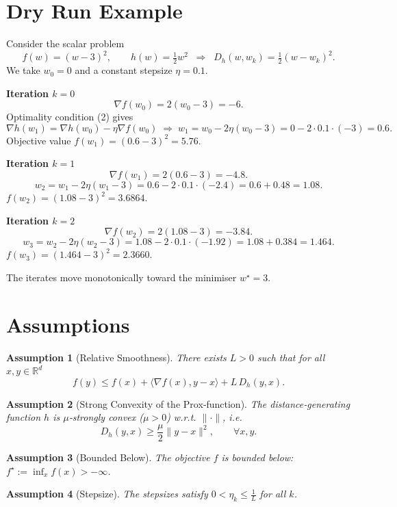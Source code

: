 \documentclass{article}
\newtheorem{assumption}{Assumption}
\newcommand{\grad}{\nabla}
\newcommand{\Breg}{D_{h}}
\begin{document}
\section*{Dry Run Example}
Consider the scalar problem  
\[
f(w)=(w-3)^2,\qquad h(w)=\tfrac12 w^{2}\;\;\Longrightarrow\;\;
\Breg (w,w_k)=\tfrac12 (w-w_k)^2 .
\]
We take $w_0=0$ and a constant stepsize $\eta=0.1$.

\bigskip
\noindent\textbf{Iteration $k=0$}
\[
\grad f(w_0)=2(w_0-3)=-6.
\]
Optimality condition (2) gives  
\[
\grad h(w_1)=\grad h(w_0)-\eta\grad f(w_0)
\;\Longrightarrow\; w_1 = w_0-2\eta (w_0-3)
                =0-2\cdot0.1\cdot(-3)=0.6 .
\]
Objective value $f(w_1)=(0.6-3)^2=5.76$.

\bigskip
\noindent\textbf{Iteration $k=1$}
\[
\grad f(w_1)=2(0.6-3)=-4.8.
\]
\[
w_2 = w_1-2\eta (w_1-3)
    =0.6-2\cdot0.1\cdot(-2.4)=0.6+0.48=1.08 .
\]
$f(w_2)=(1.08-3)^2=3.6864$.

\bigskip
\noindent\textbf{Iteration $k=2$}
\[
\grad f(w_2)=2(1.08-3)=-3.84.
\]
\[
w_3 = w_2-2\eta (w_2-3)
    =1.08-2\cdot0.1\cdot(-1.92)=1.08+0.384=1.464 .
\]
$f(w_3)=(1.464-3)^2=2.3660$.

The iterates move monotonically toward the minimiser $w^\star=3$.

\newpage
\section*{Assumptions}
\begin{assumption}[Relative Smoothness]\label{ass:smooth}
There exists $L>0$ such that for all $x,y\in\mathbb R^{d}$
\[
f(y)\le f(x)+\langle \grad f(x),y-x\rangle+L\,\Breg (y,x).
\tag{A1}
\]
\end{assumption}
\begin{assumption}[Strong Convexity of the Prox‑function]\label{ass:strong}
The distance‑generating function $h$ is $\mu$‑strongly convex ($\mu>0$) w.r.t. $\|\cdot\|$, i.e.
\[
\Breg (y,x)\ge\frac{\mu}{2}\|y-x\|^{2},\qquad\forall x,y.
\tag{A2}
\]
\end{assumption}
\begin{assumption}[Bounded Below]\label{ass:bound}
The objective $f$ is bounded below: $f^\star:=\inf_{x}f(x)>-\infty$.
\end{assumption}
\begin{assumption}[Stepsize]\label{ass:stepsize}
The stepsizes satisfy $0<\eta_k\le \frac{1}{L}$ for all $k$.
\end{assumption}
\end{document}
